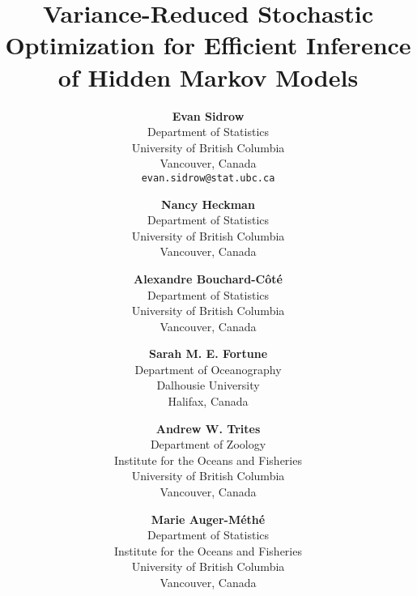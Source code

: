 \documentclass[11pt]{article}
\date{}
\begin{document}
%

\def\spacingset#1{\renewcommand{\baselinestretch}%
{#1}\small\normalsize} \spacingset{1}


{
    \title{Variance-Reduced Stochastic Optimization for Efficient Inference of Hidden Markov Models}

    \author{
      \textbf{Evan Sidrow} \\
      Department of Statistics \\
      University of British Columbia\\
      Vancouver, Canada \\
      \texttt{evan.sidrow@stat.ubc.ca} \\
      \and
      \textbf{Nancy Heckman} \\
      Department of Statistics \\
      University of British Columbia \\
      Vancouver, Canada \\
      \and
      \textbf{Alexandre Bouchard-C\^ot\'e} \\
      Department of Statistics \\
      University of British Columbia \\
      Vancouver, Canada \\
      \and
      \textbf{Sarah M. E. Fortune} \\
      Department of Oceanography \\
      Dalhousie University \\
      Halifax, Canada \\
      \and
      \textbf{Andrew W. Trites} \\
      Department of Zoology \\
      Institute for the Oceans and Fisheries \\
      University of British Columbia \\
      Vancouver, Canada \\
      \and
      \textbf{Marie Auger-M\'eth\'e} \\
      Department of Statistics \\
      Institute for the Oceans and Fisheries \\
      University of British Columbia \\
      Vancouver, Canada \\
    }
    \maketitle
}
\end{document}
